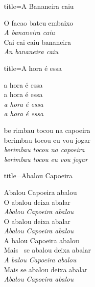 \documentclass[fontsize=14pt, paper=a4, twoside, DIV=20]{scrreprt} %
\begin{document}
\begin{multicols*}{2}
\columnbreak
\begin{song}{title={A Bananeira caiu}}
\begin{verse*}
O facao bateu embaixo\\
\textit{A bananeira caiu} \\
Cai cai caiu bananeira \\
\textit{An bananeira caiu} \\
\end{verse*}
\end{song}
\columnbreak
\begin{song}{title={A hora é essa}}
    \begin{verse*}
        a hora é essa \\
        a hora é essa \\
        \textit{
            a hora é essa \\
            a hora é essa \\        }
    \end{verse*}
\begin{verse*}
 be rimbau tocou na capoeira \\
berimbau tocou eu vou jogar \\
\textit{berimbau tocou na capoeira \\
berimbau tocou eu vou jogar}
\end{verse*}


\end{song}

\begin{song}{title={Abalou Capoeira}}
\begin{verse*}
Abalou Capoeira abalou\\
O abalou deixa abalar\\
\textit{Abalou Capoeira abalou}\\
O abalou deixa abalar\\
\textit{Abalou Capoeira abalou}\\

A balou Capoeira abalou\\
Mais \ se abalou deixa abalar\\
\textit{A} \textit{balou Capoeira abalou}\\
Mais se abalou deixa abalar\\
\textit{Abalou Capoeira abalou}\\

\end{verse*}
\end{song}


\end{multicols*}
\end{document}
